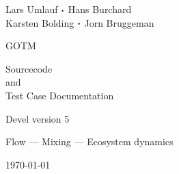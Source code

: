 \documentclass[a4paper,twoside,11pt]{article}
\begin{document}
\begin{titlepage}


{\sf \bf \LARGE
 \begin{center}
   Lars Umlauf ${\boldsymbol \cdot}$ Hans Burchard \\ Karsten Bolding
   ${\boldsymbol \cdot}$ Jorn Bruggeman
 \end{center}
}

\vspace{6mm}

{\sf \bf \Huge
 \begin{center}
   GOTM
 \end{center}
}

\vspace{6mm}

{\sf \bf \LARGE
 \begin{center}
   Sourcecode \\
      and \\
Test Case Documentation
 \end{center}
}


\vspace{5mm}

{\sf \bf \Large
 \begin{center}
  Devel version 5
 \end{center}
}

\vspace{8mm}

\begin{figure}[!h]
  \begin{center}
  \end{center}
\end{figure}

\vfill

{\sf \bf \Large
 \begin{center}
  Flow ---  Mixing --- Ecosystem dynamics
\end{center}
}


{\sf \bf \Large
 \begin{center}
\today
 \end{center}
}

\end{titlepage}

\cleardoublepage
\tableofcontents


\cleardoublepage
\end{document}
